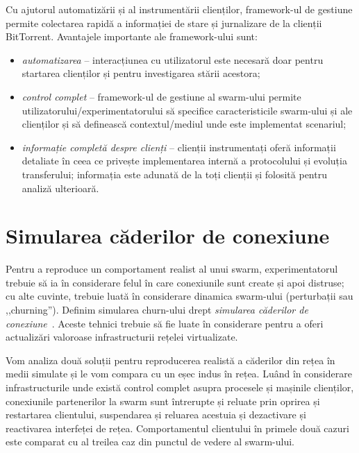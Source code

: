Cu ajutorul automatizării și al instrumentării clienților, framework-ul
de gestiune permite colectarea rapidă a informației de stare și jurnalizare
de la clienții BitTorrent. Avantajele importante ale framework-ului sunt:

\begin{itemize}
  \item \textit{automatizarea} -- interacțiunea cu utilizatorul este
  necesară doar pentru startarea clienților și pentru investigarea stării
  acestora;
  \item \textit{control complet} -- framework-ul de gestiune al swarm-ului
  permite utilizatorului/experimentatorului să specifice caracteristicile
  swarm-ului și ale clienților și să definească contextul/mediul unde
  este implementat scenariul;
  \item \textit{informație completă despre clienți} -- clienții instrumentați
  oferă informații detaliate în ceea ce privește implementarea internă a
  protocolului și evoluția transferului; informația este adunată de la
  toți clienții și folosită pentru analiză ulterioară.
\end{itemize}

\section{Simularea căderilor de conexiune}
\label{sec:virt-infra:dropouts}

Pentru a reproduce un comportament realist al unui swarm, experimentatorul
trebuie să ia în considerare felul în care conexiunile sunt create și
apoi distruse; cu alte cuvinte, trebuie luată în considerare dinamica
swarm-ului (perturbații sau ,,churning''). Definim simularea churn-ului
drept \textit{simularea căderilor de conexiune}~\cite{simulating-dropouts}.
Aceste tehnici trebuie să fie luate în considerare pentru a oferi actualizări
valoroase infrastructurii rețelei virtualizate.

Vom analiza două soluții pentru reproducerea realistă a căderilor din rețea
în medii simulate și le vom compara cu un eșec indus în rețea. Luând în
considerare infrastructurile unde există control complet asupra procesele
și mașinile clienților, conexiunile partenerilor la swarm sunt întrerupte
și reluate prin oprirea și restartarea clientului, suspendarea și reluarea
acestuia și dezactivare și reactivarea interfeței de rețea. Comportamentul
clientului în primele două cazuri este comparat cu al treilea caz din
punctul de vedere al swarm-ului.

